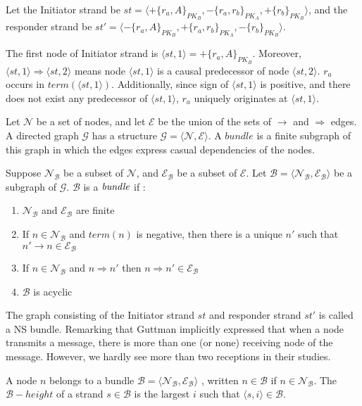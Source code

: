 Let  the Initiator strand be $st = \langle +\{r_a,A\}_{PK_B}, -\{r_a,r_b\}_{PK_A},+\{r_b\}_{PK_B} \rangle$, and the responder strand be $st' = \langle -\{r_a,A\}_{PK_B}, +\{r_a,r_b\}_{PK_A},-\{r_b\}_{PK_B} \rangle$.

The first node of Initiator strand is $\langle st,1 \rangle = +\{r_a,A\}_{PK_B}$. Moreover, $\langle st,1 \rangle \Rightarrow \langle st,2 \rangle$ means node $\langle st,1 \rangle$ is a causal predecessor of node $\langle st,2 \rangle$. $r_a$ occurs in $term(\langle st,1 \rangle)$. Additionally, since sign of $\langle st,1 \rangle$ is positive, and there does not exist any predecessor of $\langle st,1 \rangle$, $r_a$ uniquely originates at $\langle st,1 \rangle$.  
	
Let $\mathcal{N}$ be a set of nodes, and let $\mathcal{E}$ be the union of the sets of $\rightarrow$ and $\Rightarrow$ edges. A directed graph $\mathcal{G}$ has a structure $\mathcal{G} = \langle \mathcal{N},\mathcal{E}\rangle$. A $bundle$ is a finite subgraph of this graph in which the edges express casual dependencies of the nodes.

\begin{Definition} Suppose $\mathcal{N_B}$ be a subset of $\mathcal{N}$, and $\mathcal{E_B}$ be a subset of $\mathcal{E}$. Let $\mathcal{B} = \langle \mathcal{N_B},\mathcal{E_B}\rangle$ be a subgraph of $\mathcal{G}$. $\mathcal{B}$ is a $\emph{bundle}$ if :
\begin{enumerate}
\item $\mathcal{N_B}$ and $\mathcal{E_B}$ are finite
\item If $n \in \mathcal{N_B}$ and $term(n)$ is negative, then there is a unique $n'$ such that $ n' \rightarrow n \in \mathcal{E_B}$
\item If $n \in \mathcal{N_B}$ and $n \Rightarrow n'$ then $n \Rightarrow n' \in \mathcal{E_B}$ 
\item $\mathcal{B}$ is acyclic
\end{enumerate}
\end{Definition}

The graph consisting of the Initiator strand $st$ and responder strand $st'$ is called a NS bundle. Remarking that Guttman implicitly expressed that when a node transmits a message, there is more than one (or none) receiving node of the message. However, we hardly see more than two receptions in their studies. 

\begin{Definition}
A node $n$ belongs to a bundle $\mathcal{B} = \langle \mathcal{N_B},\mathcal{E_B}\rangle$ , written $n \in \mathcal{B}$ if $n \in \mathcal{N_B}$. The $\mathcal{B} -height$ of a strand $s \in \mathcal{B}$ is the largest $i$ such that $\langle s,i \rangle \in \mathcal{B}$. 
\end{Definition}


